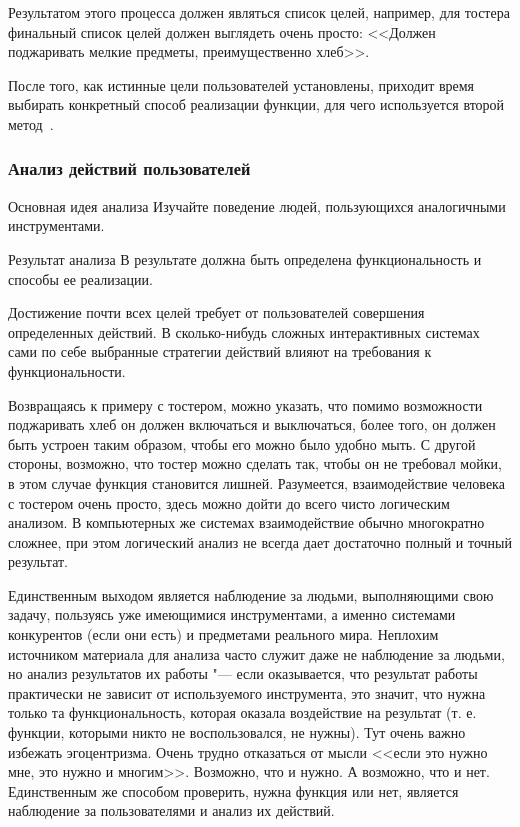 \documentclass{../industrial-development}
\begin{document}
Результатом этого процесса должен являться список целей, например, для тостера финальный список целей должен выглядеть очень просто: <<Должен поджаривать мелкие предметы, преимущественно хлеб>>.

После того, как истинные цели пользователей установлены, приходит время выбирать конкретный способ реализации функции, для чего используется второй метод~\cite[с.~112--113]{Golovach}.

\begin{frame} \frametitle{Анализ действий пользователей}
  \begin{block}{Основная идея анализа}
    Изучайте поведение людей, пользующихся аналогичными инструментами.
  \end{block}
  \begin{block}{Результат анализа}
    В результате должна быть определена функциональность и способы ее реализации.
  \end{block}
\end{frame}

\lecturenotes

Достижение почти всех целей требует от пользователей совершения определенных действий. В сколько-нибудь сложных интерактивных системах сами по себе выбранные стратегии действий влияют на требования к функциональности.

Возвращаясь к примеру с тостером, можно указать, что помимо возможности поджаривать хлеб он должен включаться и выключаться, более того, он должен быть устроен таким образом, чтобы его можно было удобно мыть. С другой стороны, возможно, что тостер можно сделать так, чтобы он не требовал мойки, в этом случае функция становится лишней. Разумеется, взаимодействие человека с тостером очень просто, здесь можно дойти до всего чисто логическим анализом. В компьютерных же системах взаимодействие обычно многократно сложнее, при этом логический анализ не всегда дает достаточно полный и точный результат.

Единственным выходом является наблюдение за людьми, выполняющими свою задачу, пользуясь уже имеющимися инструментами, а именно системами конкурентов (если они есть) и предметами реального мира. Неплохим источником материала для анализа часто служит даже не наблюдение за людьми, но анализ результатов их работы "--- если оказывается, что результат работы практически не зависит от используемого инструмента, это значит, что нужна только та функциональность, которая оказала воздействие на результат (т. е. функции, которыми никто не воспользовался, не нужны). Тут очень важно избежать эгоцентризма. Очень трудно отказаться от мысли <<если это нужно мне, это нужно и многим>>. Возможно, что и нужно. А возможно, что и нет. Единственным же способом проверить, нужна функция или нет, является наблюдение за пользователями и анализ их действий.
\end{document}

